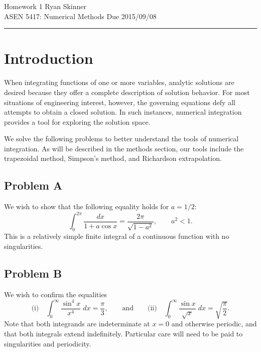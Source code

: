 \documentclass[11pt]{article}
\begin{document}
\pagestyle{fancyplain}
\lhead{}
\chead{}
\rhead{}
\cfoot{\thepage}

\noindent
{\Large Homework 1}
\hfill
{\large Ryan Skinner}
\\[0.5ex]
{\large ASEN 5417: Numerical Methods}
\hfill
{\large Due 2015/09/08}\\
\hrule
\vspace{12pt}

\section{Introduction}

When integrating functions of one or more variables, analytic solutions are desired because they offer a complete description of solution behavior. For most situations of engineering interest, however, the governing equations defy all attempts to obtain a closed solution. In such instances, numerical integration provides a tool for exploring the solution space.

We solve the following problems to better understand the tools of numerical integration. As will be described in the methods section, our tools include the trapezoidal method, Simpson's method, and Richardson extrapolation.

\subsection{Problem A}

We wish to show that the following equality holds for $a = 1/2$:
\begin{equation}
\int_{0}^{2\pi} \frac{dx}{1 + a \cos x} = \frac{2\pi}{\sqrt{1-a^2}}, \qquad a^2 < 1
.
\end{equation}
This is a relatively simple finite integral of a continuous function with no singularities.

\subsection{Problem B}

We wish to confirm the equalities
\begin{equation}
\text{(i)} \quad
\int_{0}^{\infty} \frac{\sin^4 x}{x^4} \; dx = \frac{\pi}{3}
,
\qquad
\text{and}
\qquad
\text{(ii)} \quad
\int_{0}^{\infty} \frac{\sin x}{\sqrt{x}} \; dx = \sqrt{\frac{\pi}{2}}
.
\end{equation}
Note that both integrands are indeterminate at $x=0$ and otherwise periodic, and that both integrals extend indefinitely. Particular care will need to be paid to singularities and periodicity.
\end{document}
